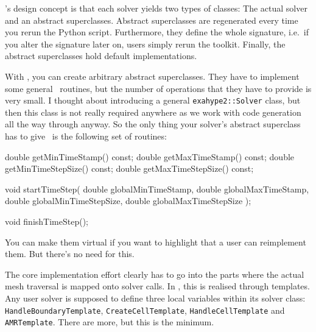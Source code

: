 \noindent
\ExaHyPE's design concept is that each solver yields two types of classes:
The actual solver and an abstract superclasses. 
Abstract superclasses are regenerated every time you rerun the Python script.
Furthermore, they define the whole signature, i.e.~if you alter the signature
later on, users simply rerun the toolkit. 
Finally, the abstract superclasses hold default implementations.


With \Peano, you can create arbitrary abstract superclasses. 
They have to implement some general \ExaHyPE\ routines, but the number of operations that they have to
provide is very small.
I thought about introducing a general \texttt{exahype2::Solver} class, but then
this class is not really required anywhere as we work with code generation all
the way through anyway. 
So the only thing your solver's abstract superclass has to give \ExaHyPE\ is the
following set of routines:

\begin{code}
  double getMinTimeStamp() const;
  double getMaxTimeStamp() const;
  double getMinTimeStepSize() const;
  double getMaxTimeStepSize() const;

  void startTimeStep(
      double globalMinTimeStamp,
      double globalMaxTimeStamp,
      double globalMinTimeStepSize,
      double globalMaxTimeStepSize
  );

  void finishTimeStep();
\end{code}
\noindent
You can make them virtual if you want to highlight that a user can reimplement
them. 
But there's no need for this. 


The core implementation effort clearly has to go into the parts where the actual
mesh traversal is mapped onto solver calls.
In \ExaHyPE, this is realised through templates. 
Any user solver is supposed to define three local variables within its solver
class:
\texttt{HandleBoundaryTemplate}, 
\texttt{CreateCellTemplate}, \texttt{HandleCellTemplate} and
\texttt{AMRTemplate}.
There are more, but this is the minimum.


